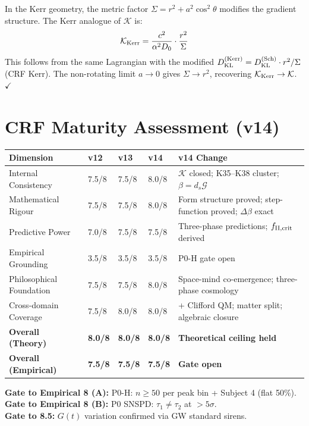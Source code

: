 \documentclass[12pt, a4paper]{article}
\begin{document}
In the Kerr geometry, the metric factor $\Sigma = r^2 + a^2\cos^2\theta$ modifies
the gradient structure. The Kerr analogue of $\mathcal{K}$ is:
\[
  \mathcal{K}_{\rm Kerr} = \frac{c^2}{\alpha^2 D_0}\cdot\frac{r^2}{\Sigma}
\]
This follows from the same Lagrangian with the modified $D_{\rm KL}^{(\rm Kerr)}
= D_{\rm KL}^{(\rm Sch)}\cdot r^2/\Sigma$ (CRF Kerr). The non-rotating limit
$a\to 0$ gives $\Sigma\to r^2$, recovering $\mathcal{K}_{\rm Kerr}\to\mathcal{K}$. $\checkmark$

\section{CRF Maturity Assessment (v14)}

\begin{center}
{\small
\renewcommand{\arraystretch}{1.35}
\begin{tabular}{p{4.5cm} p{1.3cm} p{1.3cm} p{1.3cm} p{3.8cm}}
\toprule
\textbf{Dimension} & \textbf{v12} & \textbf{v13} & \textbf{v14} & \textbf{v14 Change} \\
\midrule
Internal Consistency & 7.5/8 & 7.5/8 & 8.0/8 & $\mathcal{K}$ closed; K35--K38 cluster; $\beta=d_s\mathcal{G}$ \\
Mathematical Rigour & 7.5/8 & 7.5/8 & 8.0/8 & Form structure proved; step-function proved; $\Delta\beta$ exact \\
Predictive Power & 7.0/8 & 7.5/8 & 7.5/8 & Three-phase predictions; $f_{\rm II,crit}$ derived \\
Empirical Grounding & 3.5/8 & 3.5/8 & 3.5/8 & P0-H gate open \\
Philosophical Foundation & 7.5/8 & 7.5/8 & 8.0/8 & Space-mind co-emergence; three-phase cosmology \\
Cross-domain Coverage & 7.5/8 & 8.0/8 & 8.0/8 & + Clifford QM; matter split; algebraic closure \\
\midrule
\textbf{Overall (Theory)} & \textbf{8.0/8} & \textbf{8.0/8} & \textbf{8.0/8} & \textbf{Theoretical ceiling held} \\
\textbf{Overall (Empirical)} & \textbf{7.5/8} & \textbf{7.5/8} & \textbf{7.5/8} & \textbf{Gate open} \\
\bottomrule
\end{tabular}
}
\end{center}

\begin{center}
\textbf{Gate to Empirical 8 (A):} P0-H: $n \geq 50$ per peak bin + Subject 4 (flat 50\%).\\
\textbf{Gate to Empirical 8 (B):} P0 SNSPD: $\tau_1 \neq \tau_2$ at $>5\sigma$.\\
\textbf{Gate to 8.5:} $G(t)$ variation confirmed via GW standard sirens.
\end{center}
\end{document}
